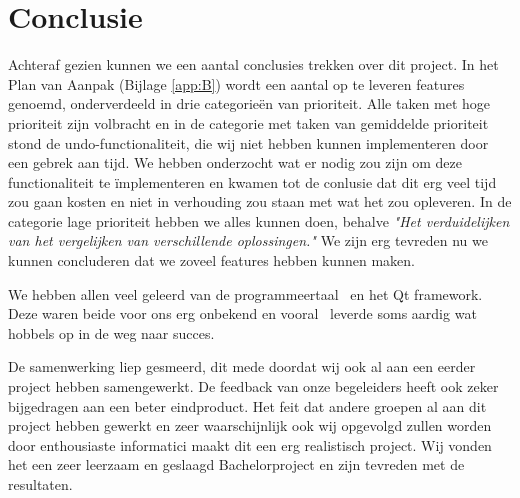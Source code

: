 \section{Conclusie}
Achteraf gezien kunnen we een aantal conclusies trekken over dit project. In het Plan van Aanpak (Bijlage \ref{app:B}) wordt een aantal op te leveren features genoemd, onderverdeeld in drie categorie\"en van prioriteit. Alle taken met hoge prioriteit zijn volbracht en in de categorie met taken van gemiddelde prioriteit stond de undo-functionaliteit, die wij niet hebben kunnen implementeren door een gebrek aan tijd. We hebben onderzocht wat er nodig zou zijn om deze functionaliteit te \"implementeren en kwamen tot de conlusie dat dit erg veel tijd zou gaan kosten en niet in verhouding zou staan met wat het zou opleveren. In de categorie lage prioriteit hebben we alles kunnen doen, behalve \emph{"Het verduidelijken van het vergelijken van verschillende oplossingen."} We zijn erg tevreden nu we kunnen concluderen dat we zoveel features hebben kunnen maken.

We hebben allen veel geleerd van de programmeertaal \cpp\ en het Qt framework. Deze waren beide voor ons erg onbekend en vooral \cpp\ leverde soms aardig wat hobbels op in de weg naar succes. 

De samenwerking liep gesmeerd, dit mede doordat wij ook al aan een eerder project hebben samengewerkt. De feedback van onze begeleiders heeft ook zeker bijgedragen aan een beter eindproduct. Het feit dat andere groepen al aan dit project hebben gewerkt en zeer waarschijnlijk ook wij opgevolgd zullen worden door enthousiaste informatici maakt dit een erg realistisch project. Wij vonden het een zeer leerzaam en geslaagd Bachelorproject en zijn tevreden met de resultaten.
